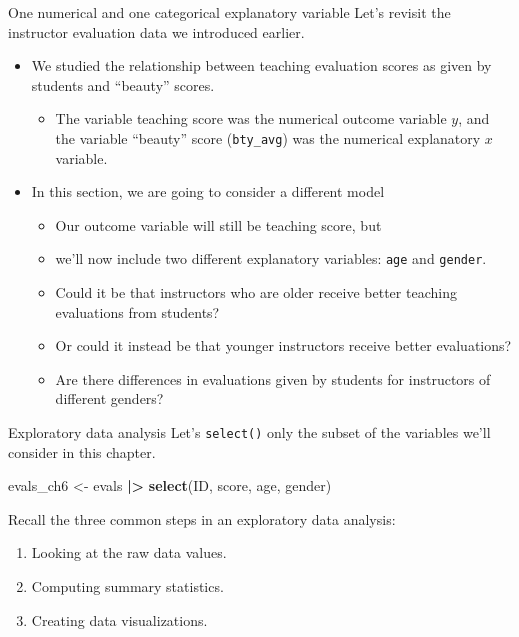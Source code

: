 \documentclass[
  ignorenonframetext,
]{beamer}
\newenvironment{Shaded}{\begin{snugshade}}{\end{snugshade}}
\newcommand{\FunctionTok}[1]{\textcolor[rgb]{0.13,0.29,0.53}{\textbf{#1}}}
\newcommand{\NormalTok}[1]{#1}
\newcommand{\OtherTok}[1]{\textcolor[rgb]{0.56,0.35,0.01}{#1}}
\newcommand{\SpecialCharTok}[1]{\textcolor[rgb]{0.81,0.36,0.00}{\textbf{#1}}}
\providecommand{\tightlist}{%
  \setlength{\itemsep}{0pt}\setlength{\parskip}{0pt}}
\begin{document}
\begin{frame}[fragile]{One numerical and one categorical explanatory
variable}
\protect\hypertarget{one-numerical-and-one-categorical-explanatory-variable}{}
Let's revisit the instructor evaluation data we introduced earlier.

\begin{itemize}
\item
  We studied the relationship between teaching evaluation scores as
  given by students and ``beauty'' scores.

  \begin{itemize}
  \tightlist
  \item
    The variable teaching score was the numerical outcome variable
    \(y\), and the variable ``beauty'' score (\texttt{bty\_avg}) was the
    numerical explanatory \(x\) variable.
  \end{itemize}
\item
  In this section, we are going to consider a different model

  \begin{itemize}
  \tightlist
  \item
    Our outcome variable will still be teaching score, but
  \item
    we'll now include two different explanatory variables: \texttt{age}
    and \texttt{gender}.
  \item
    Could it be that instructors who are older receive better teaching
    evaluations from students?
  \item
    Or could it instead be that younger instructors receive better
    evaluations?
  \item
    Are there differences in evaluations given by students for
    instructors of different genders?
  \end{itemize}
\end{itemize}
\end{frame}

\begin{frame}[fragile]{Exploratory data analysis}
\protect\hypertarget{exploratory-data-analysis-8}{}
Let's \texttt{select()} only the subset of the variables we'll consider
in this chapter.

\normalsize

\begin{Shaded}
\begin{Highlighting}[]
\NormalTok{evals\_ch6 }\OtherTok{\textless{}{-}}\NormalTok{ evals }\SpecialCharTok{|\textgreater{}}
  \FunctionTok{select}\NormalTok{(ID, score, age, gender)}
\end{Highlighting}
\end{Shaded}

\normalsize

Recall the three common steps in an exploratory data analysis:

\begin{enumerate}
\tightlist
\item
  Looking at the raw data values.
\item
  Computing summary statistics.
\item
  Creating data visualizations.
\end{enumerate}
\end{frame}
\end{document}
